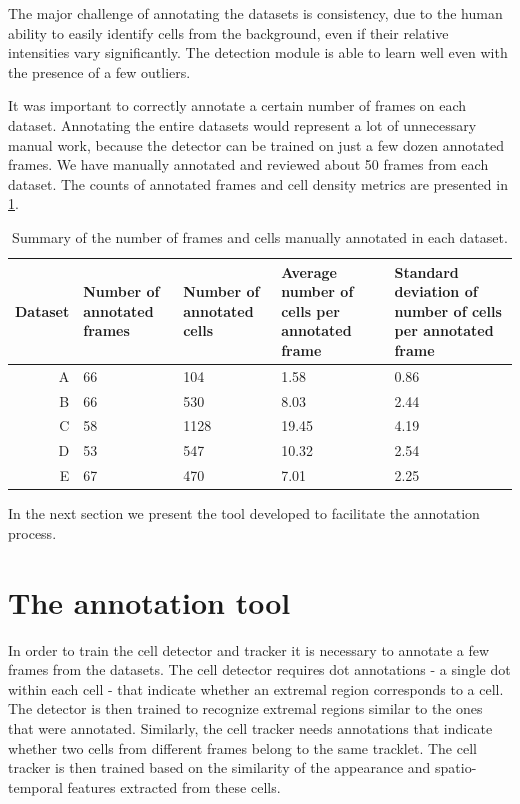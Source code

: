 	The major challenge of annotating the datasets is consistency, due to the human ability to easily identify cells from the background, even if their relative intensities vary significantly. The detection module is able to learn well even with the presence of a few outliers.
	
	It was important to correctly annotate a certain number of frames on each dataset. Annotating the entire datasets would represent a lot of unnecessary manual work, because the detector can be trained on just a few dozen annotated frames. We have manually annotated and reviewed about 50 frames from each dataset. The counts of annotated frames and cell density metrics are presented in \cref{tab:results_data_count}.

	\begin{table}[h]
		\centering
		\begin{tabular}{rp{3cm}p{3cm}p{3cm}p{4cm}}
			Dataset & Number of annotated frames & Number of annotated cells & Average number of cells per annotated frame & Standard deviation of number of cells per annotated frame \\
		\hline
			      A &    66   &   104 &   1.58  &    0.86  \\
			      B &    66   &   530 &   8.03  &    2.44  \\
			      C &    58   &  1128 &  19.45  &    4.19 \\
			      D &    53   &   547 &  10.32  &    2.54 \\
			      E &    67   &   470 &   7.01  &    2.25 
		\end{tabular} 
		\caption{
			Summary of the number of frames and cells manually annotated in each dataset.}
		\label{tab:results_data_count}
	\end{table}
	
	In the next section we present the tool developed to facilitate the annotation process.

    \section{The annotation tool \statusfirstdraft}
    \label{sec:data_tool}
    	In order to train the cell detector and tracker it is necessary to annotate a few frames from the datasets. The cell detector requires dot annotations - a single dot within each cell - that indicate whether an extremal region corresponds to a cell. The detector is then trained to recognize extremal regions similar to the ones that were annotated. Similarly, the cell tracker needs annotations that indicate whether two cells from different frames belong to the same tracklet. The cell tracker is then trained based on the similarity of the appearance and spatio-temporal features extracted from these cells.
    	
